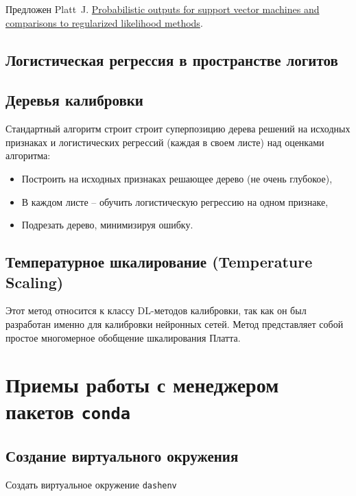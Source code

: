 \documentclass[%
	11pt,
	a4paper,
	utf8,
		]{article}
\begin{document}
Предложен Platt~J. \href{http://citeseerx.ist.psu.edu/viewdoc/download;jsessionid=EA4888FEE74FB677B492740F59CDFE1F?doi=10.1.1.41.1639&rep=rep1&type=pdf}{\ttfamily Probabilistic  outputs  for  support  vector machines and comparisons to regularized likelihood methods}.

\subsection{Логистическая регрессия в пространстве логитов}

\subsection{Деревья калибровки}

Стандартный алгоритм строит строит суперпозицию дерева решений на исходных признаках и логистических регрессий (каждая в своем листе) над оценками алгоритма:

\begin{itemize}
	\item Построить на исходных признаках решающее дерево (не очень глубокое),
	
	\item В каждом листе -- обучить логистическую регрессию на одном признаке,
	
	\item Подрезать дерево, минимизируя ошибку.
\end{itemize}

\subsection{Температурное шкалирование (Temperature Scaling)}

Этот метод относится к классу DL-методов калибровки, так как он был разработан именно для калибровки нейронных сетей. Метод представляет собой простое многомерное обобщение шкалирования Платта.

\section{Приемы работы с менеджером пакетов \texttt{conda}}

\subsection{Создание виртуального окружения}

Создать виртуальное окружение \texttt{dashenv}
\end{document}
